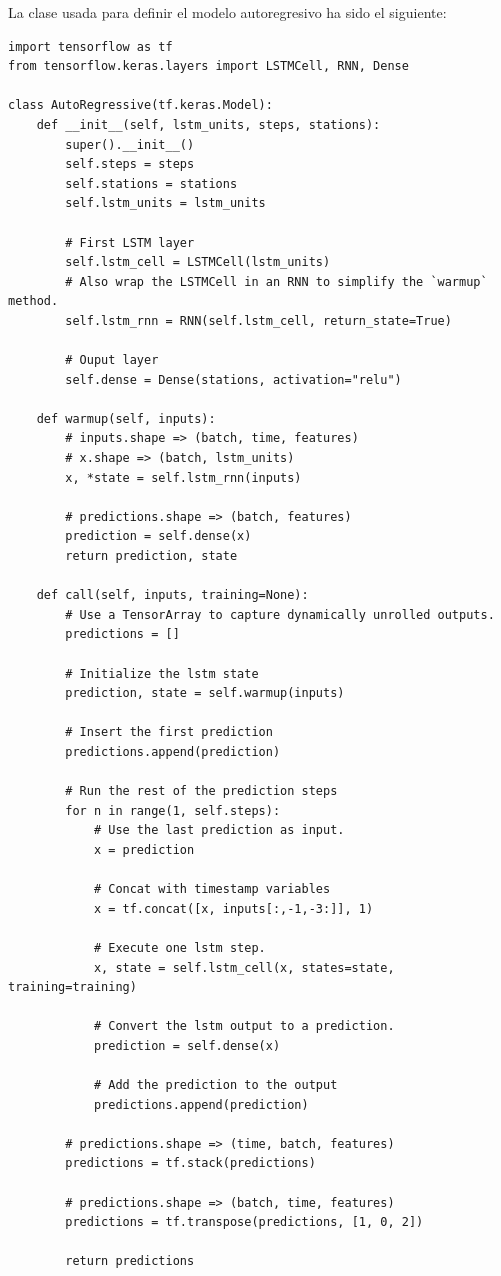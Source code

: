 La clase usada para definir el modelo autoregresivo ha sido el siguiente:
\begin{verbatim}
import tensorflow as tf
from tensorflow.keras.layers import LSTMCell, RNN, Dense

class AutoRegressive(tf.keras.Model):
    def __init__(self, lstm_units, steps, stations):
        super().__init__()
        self.steps = steps
        self.stations = stations
        self.lstm_units = lstm_units
        
        # First LSTM layer
        self.lstm_cell = LSTMCell(lstm_units)
        # Also wrap the LSTMCell in an RNN to simplify the `warmup` method.
        self.lstm_rnn = RNN(self.lstm_cell, return_state=True)
        
        # Ouput layer
        self.dense = Dense(stations, activation="relu")

    def warmup(self, inputs):
        # inputs.shape => (batch, time, features)
        # x.shape => (batch, lstm_units)
        x, *state = self.lstm_rnn(inputs)

        # predictions.shape => (batch, features)
        prediction = self.dense(x)
        return prediction, state

    def call(self, inputs, training=None):
        # Use a TensorArray to capture dynamically unrolled outputs.
        predictions = []

        # Initialize the lstm state
        prediction, state = self.warmup(inputs)

        # Insert the first prediction
        predictions.append(prediction)

        # Run the rest of the prediction steps
        for n in range(1, self.steps):
            # Use the last prediction as input.
            x = prediction
            
            # Concat with timestamp variables
            x = tf.concat([x, inputs[:,-1,-3:]], 1)
            
            # Execute one lstm step.
            x, state = self.lstm_cell(x, states=state, training=training)
                                      
            # Convert the lstm output to a prediction.
            prediction = self.dense(x)
            
            # Add the prediction to the output
            predictions.append(prediction)

        # predictions.shape => (time, batch, features)
        predictions = tf.stack(predictions)
        
        # predictions.shape => (batch, time, features)
        predictions = tf.transpose(predictions, [1, 0, 2])
        
        return predictions
\end{verbatim}


